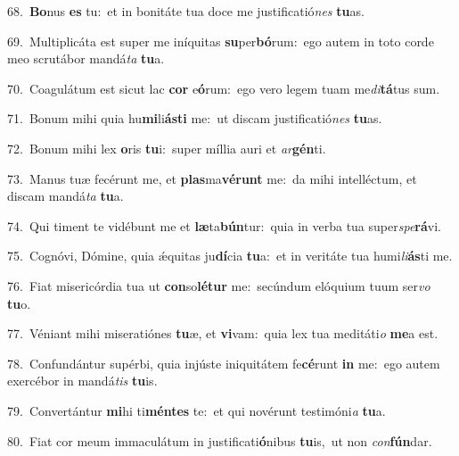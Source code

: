 {\numbfont\textcolor{\numbcolor}{68.}}~\-\textbf{Bo}\-nus \textbf{es} tu:~\star et in bonitáte tua doce me justificatió\textit{nes} \textbf{tu}\-as.\par
{\numbfont\textcolor{\numbcolor}{69.}}~Multiplicáta est super me iníquitas \textbf{su}\-per\-\textbf{bó}\-rum:~\star ego autem in toto corde meo scrutábor mandá\textit{ta} \textbf{tu}\-a.\par
{\numbfont\textcolor{\numbcolor}{70.}}~Coagulátum est sicut lac \textbf{cor} e\-\textbf{ó}\-rum:~\star ego vero legem tuam me\-\textit{di}\-\textbf{tá}tus sum.\par
{\numbfont\textcolor{\numbcolor}{71.}}~Bonum mihi quia hu\-\textbf{mi}\-li\-\textbf{ás}\-\textbf{ti} me:~\star ut discam justificatió\textit{nes} \textbf{tu}\-as.\par
{\numbfont\textcolor{\numbcolor}{72.}}~Bonum mihi lex \textbf{o}\-ris \textbf{tu}\-i:~\star super míllia auri et \textit{ar}\-\textbf{gén}ti.\par
{\numbfont\textcolor{\numbcolor}{73.}}~Manus tuæ fecérunt me, et \textbf{plas}\-ma\-\textbf{vé}\-\textbf{runt} me:~\star da mihi intelléctum, et discam mandá\textit{ta} \textbf{tu}\-a.\par
{\numbfont\textcolor{\numbcolor}{74.}}~Qui timent te vidébunt me et \textbf{læ}\-ta\-\textbf{bún}\-tur:~\star quia in verba tua super\-\textit{spe}\-\textbf{rá}vi.\par
{\numbfont\textcolor{\numbcolor}{75.}}~Cognóvi, Dómine, quia ǽquitas ju\-\textbf{dí}\-cia \textbf{tu}\-a:~\star et in veritáte tua humi\-\textit{li}\-\textbf{ás}ti me.\par
{\numbfont\textcolor{\numbcolor}{76.}}~Fiat misericórdia tua ut \textbf{con}\-so\-\textbf{lé}\-\textbf{tur} me:~\star secúndum elóquium tuum ser\textit{vo} \textbf{tu}\-o.\par
{\numbfont\textcolor{\numbcolor}{77.}}~Véniant mihi miseratiónes \textbf{tu}\-æ, et \textbf{vi}\-vam:~\star quia lex tua meditáti\textit{o} \textbf{me}\-a est.\par
{\numbfont\textcolor{\numbcolor}{78.}}~Confundántur supérbi, quia injúste iniquitátem fe\-\textbf{cé}\-runt \textbf{in} me:~\star ego autem exercébor in mandá\textit{tis} \textbf{tu}\-is.\par
{\numbfont\textcolor{\numbcolor}{79.}}~Convertántur \textbf{mi}\-hi ti\-\textbf{mén}\-\textbf{tes} te:~\star et qui novérunt testimóni\textit{a} \textbf{tu}\-a.\par
{\numbfont\textcolor{\numbcolor}{80.}}~Fiat cor meum immaculátum in justificati\-\textbf{ó}\-nibus \textbf{tu}\-is,~\star ut non \textit{con}\-\textbf{fún}dar.\par
